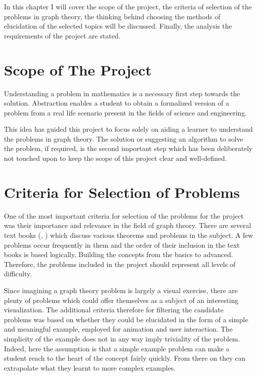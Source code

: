 
In this chapter I will cover the scope of the project, the criteria of selection of the
problems in graph theory, the thinking behind choosing the methods of
elucidation of the selected topics will be discussed. Finally, the analysis
the requirements of the project are stated.


\section{Scope of The Project}
\label{requirements: scope}
Understanding a problem in mathematics is a necessary first step towards the solution.
Abstraction enables a student to obtain a formalized version of a
problem from a real life scenario present in the fields of science and engineering.

This idea has guided this project to focus solely on aiding a learner to
understand the problems in graph theory. The solution or suggesting an
algorithm to solve the problem, if required, is the second important step which
has been deliberately not touched upon to keep the scope of this project
clear and well-defined.


\section{Criteria for Selection of Problems}
\label{section: selectionCriteria}
One of the most important criteria for selection of the problems for the
project was their importance and relevance in the field of graph
theory. There are several text books (\cite{Newman10}, 
\cite{KleinbergTardos06}) which discuss various theorems and
problems in the subject. A few problems occur frequently in them and the order of their inclusion in the text books is based
logically.  Building the concepts from the basics to advanced. Therefore, the
problems included in the project should represent all levels of difficulty.

Since imagining a graph theory problem is largely a visual exercise, there are plenty of problems which could offer themselves as a subject of an
interesting visualization. The additional criteria therefore for filtering the
candidate problems was based on whether they could be elucidated in the form of a
simple and meaningful example, employed for animation and user
interaction. The simplicity of the example does not in any way imply
triviality of the problem. Indeed, here the assumption is that a simple example
problem can make a student reach to the heart of the concept fairly quickly. From there on they can extrapolate what they learnt to more
complex examples.

